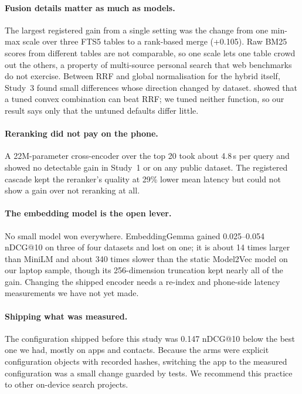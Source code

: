 \documentclass[11pt,a4paper]{article}
\makeatletter
\newcommand{\ndcg}{nDCG@10}
\makeatother
\begin{document}
\paragraph{Fusion details matter as much as models.} The largest registered gain from a single setting was the change from one min-max scale over three FTS5 tables to a rank-based merge (+0.105). Raw BM25 scores from different tables are not comparable, so one scale lets one table crowd out the others, a property of multi-source personal search that web benchmarks do not exercise. Between RRF and global normalisation for the hybrid itself, Study~3 found small differences whose direction changed by dataset. \citet{bruch2023fusion} showed that a tuned convex combination can beat RRF; we tuned neither function, so our result says only that the untuned defaults differ little.

\paragraph{Reranking did not pay on the phone.} A 22M-parameter cross-encoder over the top 20 took about 4.8\,s per query and showed no detectable gain in Study~1 or on any public dataset. The registered cascade kept the reranker's quality at 29\% lower mean latency but could not show a gain over not reranking at all.

\paragraph{The embedding model is the open lever.} No small model won everywhere. EmbeddingGemma gained 0.025--0.054 \ndcg{} on three of four datasets and lost on one; it is about 14 times larger than MiniLM and about 340 times slower than the static Model2Vec model on our laptop sample, though its 256-dimension truncation kept nearly all of the gain. Changing the shipped encoder needs a re-index and phone-side latency measurements we have not yet made.

\paragraph{Shipping what was measured.} The configuration shipped before this study was 0.147 \ndcg{} below the best one we had, mostly on apps and contacts. Because the arms were explicit configuration objects with recorded hashes, switching the app to the measured configuration was a small change guarded by tests. We recommend this practice to other on-device search projects.
\end{document}
